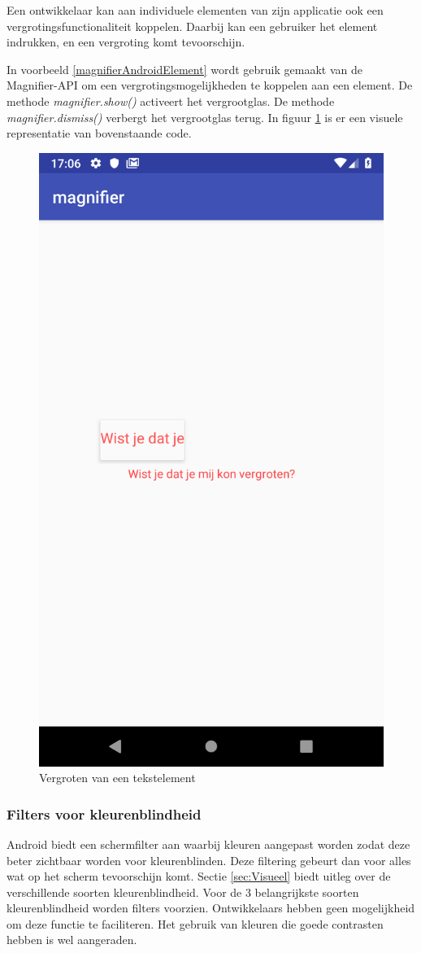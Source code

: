 Een ontwikkelaar kan aan individuele elementen van zijn applicatie ook een vergrotingsfunctionaliteit koppelen. Daarbij kan een gebruiker het element indrukken, en een vergroting komt tevoorschijn. 

In voorbeeld \ref{magnifierAndroidElement} wordt gebruik gemaakt van de Magnifier-\gls{API} om een vergrotingsmogelijkheden te koppelen aan een element. De methode \emph{magnifier.show()} activeert het vergrootglas. De methode \emph{magnifier.dismiss()} verbergt het vergrootglas terug. In figuur \ref{fig:magnifyinapp} is er een visuele representatie van bovenstaande code.
\begin{figure}[h!]
    \centering
    \includegraphics[width=0.4\linewidth]{img/magnify_in_App}
    \caption{Vergroten van een tekstelement}
    \label{fig:magnifyinapp}
\end{figure}
\newpage
\subsubsection{Filters voor kleurenblindheid}
Android biedt een schermfilter aan waarbij  kleuren aangepast worden zodat deze beter zichtbaar worden voor kleurenblinden. Deze filtering gebeurt dan voor alles wat op het scherm tevoorschijn komt. Sectie \ref{sec:Visueel} biedt uitleg over de verschillende soorten kleurenblindheid. Voor de 3 belangrijkste soorten kleurenblindheid worden filters voorzien. Ontwikkelaars hebben geen mogelijkheid om deze functie te faciliteren. Het gebruik van kleuren die goede contrasten hebben is wel aangeraden.



